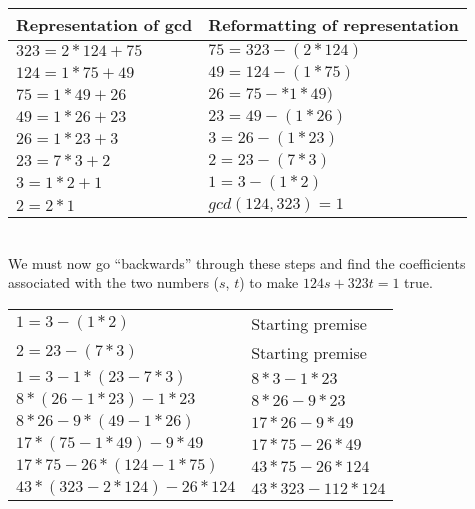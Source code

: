 \documentclass[11pt]{article}
\begin{document}
\begin{enumerate}
\begin{enumerate}[(a)]
\begin{tabular}{ll}
				Representation of gcd & Reformatting of representation \\

				\hline 

				$323 = 2 * 124 + 75$ & $75 = 323 - (2 * 124)$\\

				$124 = 1 * 75 +49$ & $49 = 124 - (1 * 75)$\\

				$75 = 1 * 49 + 26$ & $26 = 75 - *1*49)$\\

				$49 = 1 * 26 + 23$ & $23 = 49 - (1 * 26)$\\

				$26 = 1 * 23 + 3$ & $3 = 26 - (1 * 23)$\\

				$23 = 7 * 3 + 2$ & $2 = 23 - (7 * 3)$\\

				$3 = 1 * 2 + 1$ & $1 = 3 - (1 * 2)$\\

				$2 = 2 * 1$ & $gcd(124, 323) = 1$ \\

			\end{tabular} \\

			We must now go ``backwards'' through these steps and find the coefficients associated with the two numbers ($s$, $t$)
			to make $124s + 323t = 1$ true.

			\begin{tabular}{ll}
				$1 = 3 - (1 * 2)$ & Starting premise\\

				$2 = 23 - (7 * 3)$ & Starting premise\\

				$1 = 3 - 1 * (23 - 7 * 3)$ & $8 * 3 - 1 * 23$ \\

				$8 * (26 - 1 * 23) - 1 * 23$ & $8 * 26 - 9 * 23$ \\

				$8 * 26 - 9 * (49 - 1 * 26)$ & $17 * 26 - 9 * 49$ \\

				$17 * (75 - 1 * 49) - 9 * 49$ & $17 * 75 - 26 * 49$ \\

				$17 * 75 - 26 * (124 - 1 * 75)$ & $43 * 75 - 26 * 124$ \\

				$43 * (323 - 2 * 124) - 26 * 124$ & $43 * 323 - 112 * 124$ \\


\end{tabular}
\end{enumerate}
\end{enumerate}
\end{document}
